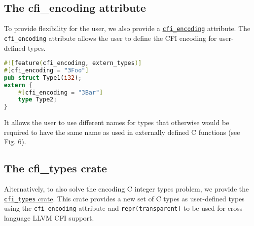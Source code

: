 \documentclass{article}
\begin{document}
\subsection{The cfi\_encoding attribute}

To provide flexibility for the user, we also provide a \texttt{\href{https://doc.rust-lang.org/nightly/unstable-book/language-features/cfi-encoding.html#cfi_encoding}{cfi\_encoding}} attribute. The \texttt{cfi\_encoding} attribute allows the user to define the CFI encoding for user-defined types.

\begin{lstlisting}[language=Rust, caption={Example user-defined types using the cfi\_encoding attribute.}]
#![feature(cfi_encoding, extern_types)]
#[cfi_encoding = "3Foo"]
pub struct Type1(i32);
extern {
    #[cfi_encoding = "3Bar"]
    type Type2;
}
\end{lstlisting}

It allows the user to use different names for types that otherwise would be required to have the same name as used in externally defined C functions (see Fig. 6).


\subsection{The cfi\_types crate}

Alternatively, to also solve the encoding C integer types problem, we provide the \href{https://github.com/rcvalle/rust-cfi-types}{\texttt{cfi\_types} crate}. This crate provides a new set of C types as user-defined types using the \texttt{cfi\_encoding} attribute and \texttt{repr(transparent)} to be used for cross-language LLVM CFI support.
\end{document}
